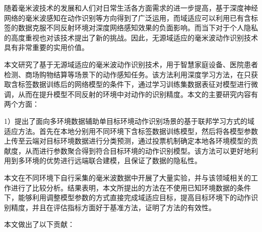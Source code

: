 
\begin{chineseabstract}

随着毫米波技术的发展和人们对日常生活各方面需求的进一步提高，基于深度神经网络的毫米波感知在动作识别等方向得到了广泛运用，而域适应可以利用已有含标签的数据克服不同反射环境对深度网络感知效果的负面影响。而当下对于个人隐私的高度重视也对该技术提出了新的挑战。因此，无源域适应的毫米波动作识别技术具有非常重要的实用价值。

本文研究了基于无源域适应的毫米波动作识别技术，用于智慧家庭设备、医院患者检测、商场购物结算等场景下的动作感知任务。该方法利用深度学习方法，在只获取含标签数据训练后的网络模型的条件下，通过学习训练集数据表征对模型进行微调，从而在提升模型不同反射的环境中对动作的识别精度。本文的主要研究内容有两个方面：

1）提出了面向多环境数据辅助单目标环境动作识别场景的基于联邦学习方式的域适应方法。首先在本地分别用不同环境下含标签数据训练模型，然后将各模型参数上传至云端对目标环境数据进行分类预测，通过投票机制确定本地各环境模型的贡献度，从而进行参数聚合得到符合目标环境的动作识别模型。该方法可以更好地利用到多环境的优势进行远端联合建模，且保证了数据的隐私性。

本文在不同环境下自行采集的毫米波数据中开展了大量实验，并与该领域相关的工作进行了比较分析。结果表明，本文所提出的方法在不使用已知环境数据的条件下，能够利用调整模型参数的方式直接完成域适应目标，提高目标环境下的动作识别精度，并且在评估指标方面好于基准方法，证明了方法的有效性。

本文做出了以下贡献：


\end{chineseabstract}

